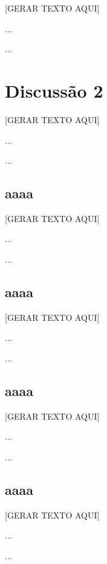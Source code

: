             [GERAR TEXTO AQUI]

            ...

            ...
        
    \section{Discussão 2}
        
            [GERAR TEXTO AQUI]

            ...
            
            ...
        
        \subsection{aaaa}

            [GERAR TEXTO AQUI]

            ...
            
            ...
        
        \subsection{aaaa}
        
            [GERAR TEXTO AQUI]

            ...
            
            ...
            
        \subsection{aaaa}
        
            [GERAR TEXTO AQUI]

            ...
            
            ...
            
        \subsection{aaaa}
        
            [GERAR TEXTO AQUI]

            ...
            
            ...
